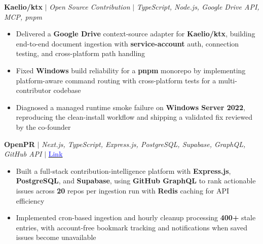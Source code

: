 \documentclass{article}
\begin{document}
\vspace{2mm}

{\large \noindent \textbf{Kaelio/ktx} $\mid$ \textit{Open Source Contribution} $\mid$ \textit{TypeScript, Node.js, Google Drive API, MCP, pnpm}}

{\small
\begin{itemize}[noitemsep, nolistsep, leftmargin=*, itemsep=1mm]
\item Delivered a \textbf{Google Drive} context-source adapter for \textbf{Kaelio/ktx}, building end-to-end document ingestion with \textbf{service-account} auth, connection testing, and cross-platform path handling

\item Fixed \textbf{Windows} build reliability for a \textbf{pnpm} monorepo by implementing platform-aware command routing with cross-platform tests for a multi-contributor codebase

\item Diagnosed a managed runtime smoke failure on \textbf{Windows Server 2022}, reproducing the clean-install workflow and shipping a validated fix reviewed by the co-founder
\end{itemize}
}

\vspace{2mm}

{\large \noindent \textbf{OpenPR} $\mid$ \textit{Next.js, TypeScript, Express.js, PostgreSQL, Supabase, GraphQL, GitHub API} $\mid$ \href{https://github.com/aryanpandit/openpr}{\textcolor{blue}{Link}}}

{\small
\begin{itemize}[noitemsep, nolistsep, leftmargin=*, itemsep=1mm]
\item Built a full-stack contribution-intelligence platform with \textbf{Express.js}, \textbf{PostgreSQL}, and \textbf{Supabase}, using \textbf{GitHub GraphQL} to rank actionable issues across \textbf{20} repos per ingestion run with \textbf{Redis} caching for API efficiency

\item Implemented cron-based ingestion and hourly cleanup processing \textbf{400+} stale entries, with account-free bookmark tracking and notifications when saved issues become unavailable
\end{itemize}
}
\end{document}
